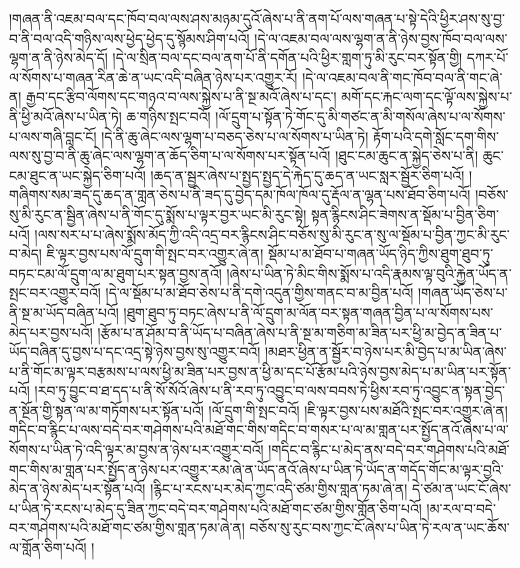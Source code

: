 །གཞན་ནི་འཇམ་བལ་དང་ཁོབ་བལ་ལས་ཤས་མཉམ་དུའོ་ཞེས་པ་ནི་ནག་པོ་ལས་གཞན་པ་སྟེ་དེའི་ཕྱིར་ཤས་སུ་བྱ་བ་ནི་བལ་འདི་གཉིས་ལས་ཕྱེད་ཕྱེད་དུ་སྙོམས་ཤིག་པའོ། །དེ་ལ་འཇམ་བལ་ལས་ལྷག་ན་ནི་ཉེས་བྱས་ཁོབ་བལ་ལས་ལྷག་ན་ནི་ཉེས་མེད་དོ། །དེ་ལ་སྲིན་བལ་དང་བལ་ནག་པོ་ནི་དགོན་པའི་ཕྱིར་གླག་ཏུ་མི་རུང་བར་སྟོན་གྱི། དཀར་པོ་ལ་སོགས་པ་གཞན་རིན་ཆེ་ན་ཡང་འདི་བཞིན་ཉེས་པར་འགྱུར་རོ། །དེ་ལ་འཇམ་བལ་ནི་གང་ཁོབ་བལ་ནི་གང་ཞེ་ན། རྒྱབ་དང་རྩིབ་ལོགས་དང་གཉའ་བ་ལས་སྐྱེས་པ་ནི་སྔ་མའོ་ཞེས་པ་དང་། མགོ་དང་རྐང་ལག་དང་ལྟོ་ལས་སྐྱེས་པ་ནི་ཕྱི་མའོ་ཞེས་པ་ཡིན་ཏེ། ཆ་གཉིས་སྤང་བའོ། །ལོ་དྲུག་པ་སྟོན་ཏེ་གོང་དུ་མི་གཙང་ན་མི་གསོལ་ཞེས་པ་ལ་སོགས་པ་ལས་གཞི་བླང་ངོ། །དེ་ནི་ཆུ་ཞེང་ལས་ལྷག་པ་བཅད་ཅེས་པ་ལ་སོགས་པ་ཡིན་ཏེ། རྟོག་པའི་དགེ་སློང་དག་གིས་ལས་སུ་བྱ་བ་ནི་ཆུ་ཞེང་ལས་ལྷག་ན་ཆོད་ཅིག་པ་ལ་སོགས་པར་སྟོན་པའོ། །ཐུང་ངམ་ཆུང་ན་སྐྱེད་ཅེས་པ་ནི། ཆུང་ངམ་ཐུང་ན་ཡང་སྐྱེད་ཅིག་པའོ། །ཆད་ན་སྦྱར་ཞེས་པ་སྤྱད་སྤྱད་དེ་རྐེད་དུ་ཆད་ན་ཡང་སླར་སྦྱོར་ཅིག་པའོ། །གཞིགས་སམ་ཟད་དུ་ཆད་ན་གླན་ཅེས་པ་ནི་ཟད་དུ་བྱེད་དམ་ཁོལ་ཁོལ་དུ་རྡོལ་ན་ལྷན་པས་ཐོབ་ཅིག་པའོ། །བཅོས་སུ་མི་རུང་ན་སྦྱིན་ཞེས་པ་ནི་གོང་དུ་སྨོས་པ་ལྟར་བྱར་ཡང་མི་རུང་སྟེ། སྟན་རྙིངས་ཤིང་ཟེགས་ན་སྡོམ་པ་བྱིན་ཅིག་པའོ། །ལས་སར་པ་པ་ཞེས་སྨོས་མོད་ཀྱི་འདི་འདྲ་བར་རྙིངས་ཤིང་བཅོས་སུ་མི་རུང་ན་སུ་ལ་སྡོམ་པ་བྱིན་ཀྱང་མི་རུང་བ་མེད། ཇི་ལྟར་བྱས་པས་ལོ་དྲུག་གི་སྤང་བར་འགྱུར་ཞེ་ན། སྡོམ་པ་མ་ཐོབ་པ་གཞན་ཡོད་ཉིད་ཀྱིས་ཐུག་ཐུབ་ཏུ་བཏང་ངམ་ལོ་དྲུག་ལ་མ་ཐུག་པར་སྟན་བྱས་ནའོ། །ཞེས་པ་ཡིན་ཏེ་མིང་གིས་སྨོས་པ་འདི་རྣམས་ལྟ་བུའི་རྐྱེན་ཡོད་ན་སྤང་བར་འགྱུར་བའོ། །དེ་ལ་སྡོམ་པ་མ་ཐོབ་ཅེས་པ་ནི་དགེ་འདུན་གྱིས་གནང་བ་མ་བྱིན་པའོ། །གཞན་ཡོད་ཅེས་པ་ནི་སྔ་མ་ཡོད་བཞིན་པའོ། །ཐུག་ཐུབ་ཏུ་བཏང་ཞེས་པ་ནི་ལོ་དྲུག་མ་ལོན་བར་སྟན་གཞན་བྱིན་པ་ལ་སོགས་པས་མེད་པར་བྱས་པའོ། །རྩོམ་པ་ན་ཤོམ་བ་ནི་ཡོད་པ་བཞིན་ཞེས་པ་ནི་སྔ་མ་གཅིག་མ་ཟིན་པར་ཕྱི་མ་བྱེད་ན་ཟིན་པ་ཡོད་བཞིན་དུ་བྱས་པ་དང་འདྲ་སྟེ་ཉེས་བྱས་སུ་འགྱུར་བའོ། །མཐར་ཕྱིན་ན་སྦྱོར་བ་ཉེས་པར་མི་བྱེད་པ་མ་ཡིན་ཞེས་པ་ནི་གོང་མ་ལྟར་བརྩམས་པ་ལས་ཕྱི་མ་ཟིན་པར་བྱས་ན་ཕྱི་མ་དང་པོ་རྩོམ་པའི་ཉེས་བྱས་མེད་པ་མ་ཡིན་པར་སྟོན་པའོ། །རབ་ཏུ་བྱུང་བ་ཐ་དད་པ་ནི་སོ་སོའོ་ཞེས་པ་ནི་རབ་ཏུ་འབྱུང་བ་ལས་བབས་ཏེ་ཕྱིས་རབ་ཏུ་འབྱུང་ན་སྟན་བྱེད་ན་སྔོན་གྱི་སྟན་ལ་མ་གཏོགས་པར་སྟོན་པའོ། །ལོ་དྲུག་གི་སྤང་བའོ། །ཇི་ལྟར་བྱས་པས་མཐོའི་སྤང་བར་འགྱུར་ཞེ་ན། གདིང་བ་རྙིང་པ་ལས་བདེ་བར་གཤེགས་པའི་མཐོ་གང་གིས་གདིང་བ་གསར་པ་ལ་མ་གླན་པར་སྤྱོད་ནའོ་ཞེས་པ་ལ་སོགས་པ་ཡིན་ཏེ་འདི་ལྟར་མ་བྱས་ན་ཉེས་པར་འགྱུར་བའོ། །གདིང་བ་རྙིང་པ་མེད་ནས་བདེ་བར་གཤེགས་པའི་མཐོ་གང་གིས་མ་གླན་པར་སྤྱོད་ན་ཉེས་པར་འགྱུར་རམ་ཞེ་ན་ཡོད་ནའོ་ཞེས་པ་ཡིན་ཏེ་ཡོད་ན་གདོད་གོང་མ་ལྟར་བྱའི་མེད་ན་ཉེས་མེད་པར་སྟོན་པའོ། །རྙིང་པ་རངས་པར་མེད་ཀྱང་འདི་ཙམ་གྱིས་གླན་ཏམ་ཞེ་ན། དེ་ཙམ་ན་ཡང་ངོ་ཞེས་པ་ཡིན་ཏེ་རངས་པ་མེད་དུ་ཟིན་ཀྱང་བདེ་བར་གཤེགས་པའི་མཐོ་གང་ཙམ་གྱིས་གློན་ཅིག་པའོ། །མ་རལ་བ་བདེ་བར་གཤེགས་པའི་མཐོ་གང་ཙམ་གྱིས་གླན་ཏམ་ཞེ་ན། བཅོས་སུ་རུང་བས་ཀྱང་ངོ་ཞེས་པ་ཡིན་ཏེ་རལ་ན་ཡང་ཆོས་ལ་གློན་ཅིག་པའོ། །
